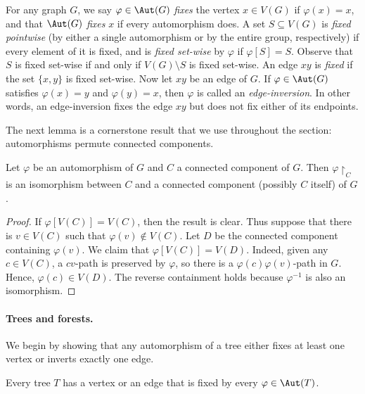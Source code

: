 For any graph $G$, we say $\varphi\in\Aut(G)$ \emph{fixes} the vertex $x\in V(G)$ if $\varphi(x)=x$, and that $\Aut(G)$ \emph{fixes} $x$ if every automorphism does.
A set $S\subseteq V(G)$ is \emph{fixed pointwise} (by either a single automorphism or by the entire group, respectively) if every element of it is fixed, and is \emph{fixed set-wise} by $\varphi$ if $\varphi[S]=S$.
Observe that $S$ is fixed set-wise if and only if $V(G)\setminus S$ is fixed set-wise.
An edge $xy$ is \emph{fixed} if the set $\{x,y\}$ is fixed set-wise.
Now let $xy$ be an edge of $G$.
If $\varphi\in\Aut(G)$ satisfies $\varphi(x)=y$ and $\varphi(y)=x$, then $\varphi$ is called an \emph{edge-inversion}.
In other words, an edge-inversion fixes the edge $xy$ but does not fix either of its endpoints.

The next lemma is a cornerstone result that we use throughout the section: automorphisms permute connected components.

\begin{lemma}\label{lemma:restriction-aut-component}
    Let $\varphi$ be an automorphism of $G$ and $C$ a connected component of $G$.
    Then $\varphi\restriction_C$ is an isomorphism between $C$ and a connected component (possibly $C$ itself) of $G$.
\end{lemma}

\begin{proof}
    If $\varphi[V(C)]=V(C)$, then the result is clear.
    Thus suppose that there is $v\in V(C)$ such that $\varphi(v)\notin V(C)$.
    Let $D$ be the connected component containing $\varphi(v)$.
    We claim that $\varphi[V(C)]=V(D)$.
    Indeed, given any $c\in V(C)$, a $cv$-path is preserved by $\varphi$, so there is a $\varphi(c)\varphi(v)$-path in $G$.
    Hence, $\varphi(c)\in V(D)$.
    The reverse containment holds because $\varphi^{-1}$ is also an isomorphism.
\end{proof}

\paragraph{Trees and forests.}

We begin by showing that any automorphism of a tree either fixes at least one vertex or inverts exactly one edge.

\begin{lemma}\label{lemma:aut-fixes-vertex-or-edge}
    Every tree $T$ has a vertex or an edge that is fixed by every $\varphi\in\Aut(T)$.
\end{lemma}


